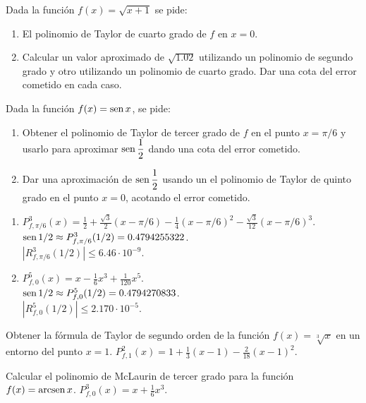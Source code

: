 
{Dada la función $f(x)=\sqrt{x+1}$ se pide:
\begin{enumerate}
\item  El polinomio de Taylor de cuarto grado de $f$ en $x=0$.
\item  Calcular un valor aproximado de $\sqrt{1.02}$ utilizando un polinomio de segundo grado y otro utilizando un polinomio de cuarto grado. Dar una cota del error cometido en cada caso.
\end{enumerate}
}


{Dada la función $f(x)=\operatorname{sen} x$, se pide:
\begin{enumerate}
\item  Obtener el polinomio de Taylor de tercer grado de $f$ en el punto $x=\pi/6$ y usarlo para aproximar $\operatorname{sen}\dfrac{1}{2}$ dando una cota del error cometido.
\item  Dar una aproximación de $\operatorname{sen}\dfrac{1}{2}$ usando un el polinomio de Taylor de quinto grado en el punto $x=0$, acotando el error cometido.
\end{enumerate}
}
{
\begin{enumerate}
\item $P^3_{f,\pi/6}(x) = \frac{1}{2}+\frac{\sqrt{3}}{2}(x-\pi/6)-\frac{1}{4}(x-\pi/6)^2-\frac{\sqrt{3}}{12}(x-\pi/6)^3$.\\
$\operatorname{sen} 1/2 \approx P^3_{f,\pi/6}(1/2) = 0.4794255322$.\\
$|R^3_{f,\pi/6}(1/2)|\leq 6.46\cdot 10^{-9}$.
\item $P^5_{f,0}(x) = x -\frac{1}{6} x^3 + \frac{1}{120}x^5$.\\
$\operatorname{sen} 1/2 \approx P^5_{f,0}(1/2) = 0.4794270833$.\\
$|R^5_{f,0}(1/2)|\leq 2.170\cdot 10^{-5}$.
\end{enumerate}
}
{
}


{Obtener la fórmula de Taylor de segundo orden de la función $f(x)=\sqrt[3]{x}$ en un entorno del punto $x=1$.
}
{$P^2_{f,1}(x) = 1+\frac{1}{3}(x-1)-\frac{2}{18}(x-1)^2$. 
}
{
}


{Calcular el polinomio de McLaurin de tercer grado para la función $f(x)=\operatorname{arcsen} x$.
}
{$P^3_{f,0}(x) = x+\frac{1}{6}x^3$. 
}
{
}


